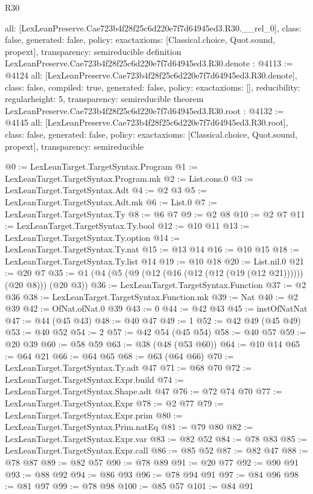 \begin{lexlean}{R30}
\begin{coremodule}
{  all: [LexLeanPreserve.Cae723b4f28f25c6d220e7f7d64945ed3.R30.__rel_0],
  class: false,
  generated: false,
  policy: exact{axioms: [Classical.choice, Quot.sound, propext]},
  transparency: semireducible
}
definition LexLeanPreserve.Cae723b4f28f25c6d220e7f7d64945ed3.R30.denote : @4113 := @4124 {
  all: [LexLeanPreserve.Cae723b4f28f25c6d220e7f7d64945ed3.R30.denote],
  class: false,
  compiled: true,
  generated: false,
  policy: exact{axioms: []},
  reducibility: regular{height: 5},
  transparency: semireducible
}
theorem LexLeanPreserve.Cae723b4f28f25c6d220e7f7d64945ed3.R30.root : @4132 := @4145 {
  all: [LexLeanPreserve.Cae723b4f28f25c6d220e7f7d64945ed3.R30.root],
  class: false,
  generated: false,
  policy: exact{axioms: [Classical.choice, Quot.sound, propext]},
  transparency: semireducible
}

@0 := LexLeanTarget.TargetSyntax.Program
@1 := LexLeanTarget.TargetSyntax.Program.mk
@2 := List.cons.{0}
@3 := LexLeanTarget.TargetSyntax.Adt
@4 := @2 @3
@5 := LexLeanTarget.TargetSyntax.Adt.mk
@6 := List.{0}
@7 := LexLeanTarget.TargetSyntax.Ty
@8 := @6 @7
@9 := @2 @8
@10 := @2 @7
@11 := LexLeanTarget.TargetSyntax.Ty.bool
@12 := @10 @11
@13 := LexLeanTarget.TargetSyntax.Ty.option
@14 := LexLeanTarget.TargetSyntax.Ty.nat
@15 := @13 @14
@16 := @10 @15
@18 := LexLeanTarget.TargetSyntax.Ty.list @14
@19 := @10 @18
@20 := List.nil.{0}
@21 := @20 @7
@35 := @1 (@4 (@5 (@9 (@12 (@16 (@12 (@12 (@19 (@12 @21)))))) (@20 @8))) (@20 @3))
@36 := LexLeanTarget.TargetSyntax.Function
@37 := @2 @36
@38 := LexLeanTarget.TargetSyntax.Function.mk
@39 := Nat
@40 := @2 @39
@42 := OfNat.ofNat.{0} @39
@43 := 0
@44 := @42 @43
@45 := instOfNatNat
@47 := @44 (@45 @43)
@48 := @40 @47
@49 := 1
@52 := @42 @49 (@45 @49)
@53 := @40 @52
@54 := 2
@57 := @42 @54 (@45 @54)
@58 := @40 @57
@59 := @20 @39
@60 := @58 @59
@63 := @38 (@48 (@53 @60))
@64 := @10 @14
@65 := @64 @21
@66 := @64 @65
@68 := @63 (@64 @66)
@70 := LexLeanTarget.TargetSyntax.Ty.adt @47
@71 := @68 @70
@72 := LexLeanTarget.TargetSyntax.Expr.build
@74 := LexLeanTarget.TargetSyntax.Shape.adt @47
@76 := @72 @74 @70
@77 := LexLeanTarget.TargetSyntax.Expr
@78 := @2 @77
@79 := LexLeanTarget.TargetSyntax.Expr.prim
@80 := LexLeanTarget.TargetSyntax.Prim.natEq
@81 := @79 @80
@82 := LexLeanTarget.TargetSyntax.Expr.var
@83 := @82 @52
@84 := @78 @83
@85 := LexLeanTarget.TargetSyntax.Expr.call
@86 := @85 @52
@87 := @82 @47
@88 := @78 @87
@89 := @82 @57
@90 := @78 @89
@91 := @20 @77
@92 := @90 @91
@93 := @88 @92
@94 := @86 @93
@96 := @78 @94 @91
@97 := @84 @96
@98 := @81 @97
@99 := @78 @98
@100 := @85 @57
@101 := @84 @91

\end{coremodule}
\end{lexlean}

